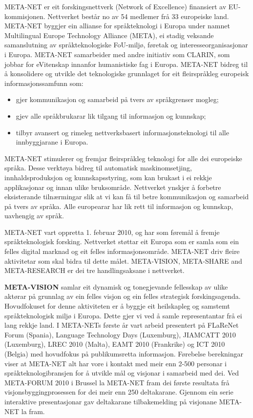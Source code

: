 \clearpage


\begin{multicols}{2}
META-NET er eit forskingsnettverk (Network of Excellence) finansiert av EU-kommisjonen. Nettverket består no av 54 medlemer frå 33 europeiske land. 
META-NET byggjer ein allianse for språkteknologi i Europa under namnet Multilingual Europe Technology Alliance (META), ei stadig veksande samanslutning av språkteknologiske FoU-miljø, føretak og interesseorganisasjonar i Europa.
META-NET samarbeider med andre initiativ som CLARIN, som jobbar for eVitenskap innanfor humanistiske fag i Europa. META-NET bidreg til å konsolidere og utvikle det teknologiske grunnlaget for eit fleirspråkleg europeisk informasjonssamfunn som:

\begin{itemize}
\item gjer kommunikasjon og samarbeid på tvers av språkgrenser mogleg;
\item gjev alle språkbrukarar lik tilgang til informasjon og kunnskap;
\item tilbyr avansert og rimeleg nettverksbasert informasjonsteknologi til alle innbyggjarane i Europa.
\end{itemize}

META-NET stimulerer og fremjar fleirspråkleg teknologi for alle dei europeiske språka. Desse verktøya bidreg til automatisk maskinomsetjing, innhaldsproduksjon og kunnskapsstyring, som kan brukast i ei rekkje applikasjonar og innan ulike bruksområde. Nettverket ynskjer å forbetre eksisterande tilnærmingar slik at vi kan få til betre kommunikasjon og samarbeid på tvers av språka. Alle europearar har lik rett til informasjon og kunnskap, uavhengig av språk.

META-NET vart oppretta 1. februar 2010, og har som føremål å fremje språkteknologisk forsking. Nettverket støttar eit Europa som er samla som ein felles digital marknad og eit felles informasjonsområde. META-NET driv fleire aktivitetar som skal bidra til dette målet. META-VISION, META-SHARE and META-RESEARCH er dei tre handlingsaksane i nettverket. 

\textbf{META-VISION} samlar eit dynamisk og tonegjevande fellesskap av ulike aktørar på grunnlag av ein felles visjon og ein felles strategisk forskingsagenda. Hovudfokuset for denne aktiviteten er å byggje eit heilskapleg og samstemt språkteknologisk miljø i Europa. Dette gjer vi ved å samle representantar frå ei lang rekkje land. I META-NETs første år vart arbeid presentert på FLaReNet Forum (Spania), Language Technology Days (Luxemburg), JIAMCATT 2010 (Luxemburg), LREC 2010 (Malta), EAMT 2010 (Frankrike) og ICT 2010 (Belgia) med hovudfokus på publikumsretta informasjon. Førebelse berekningar viser at META-NET alt har vore i kontakt med meir enn 2-500 personar i språkteknologibransjen for å utvikle mål og visjonar i samarbeid med dei. Ved META-FORUM 2010 i Brussel la META-NET fram dei første resultata frå visjonsbyggingprosessen for dei meir enn 250 deltakarane. Gjennom ein serie interaktive presentasjonar gav deltakarane tilbakemelding på visjonane META-NET la fram.


\end{multicols}
